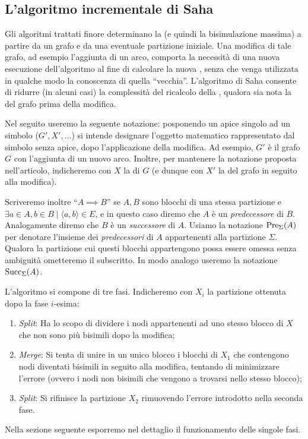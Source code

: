 \subsection{L'algoritmo incrementale di Saha}
Gli algoritmi trattati finore determinano la \rscpnomath (e quindi la bisimulazione massima) a partire da un grafo e da una eventuale partizione iniziale. Una modifica di tale grafo, ad esempio l'aggiunta di un arco, comporta la necessità di una nuova esecuzione dell'algoritmo al fine di calcolare la nuova \rscpnomath, senza che venga utilizzata in qualche modo la conoscenza di quella ``vecchia''. L'algoritmo di Saha \cite{saha} consente di ridurre (in alcuni casi) la complessità del ricalcolo della \rscpnomath, qualora sia nota la \rscpnomath del grafo prima della modifica.

Nel seguito useremo la seguente notazione: posponendo un apice singolo ad un simbolo ($G', X', \dots$) si intende designare l'oggetto matematico rappresentato dal simbolo senza apice, dopo l'applicazione della modifica. Ad esempio, $G'$ è il grafo $G$ con l'aggiunta di un nuovo arco. Inoltre, per mantenere la notazione proposta nell'articolo, indicheremo con $X$ la \rscpnomath di $G$ (e dunque con $X'$ la \rscpnomath del grafo in seguito alla modifica).

Scriveremo inoltre ``$A \implies B$'' se $A,B$ sono blocchi di una stessa partizione e $\exists a \in A, b \in B \mid \langle a, b\rangle \in E$, e in questo caso diremo che $A$ è un \emph{predecessore} di $B$. Analogamente diremo che $B$ è un \emph{successore} di $A$. Usiamo la notazione $\textup{Pre}_{\Sigma}(A)$ per denotare l'insieme dei \emph{predecessori} di $A$ appartenenti alla partizione $\Sigma$. Qualora la partizione cui questi blocchi appartengono possa essere omessa senza ambiguità ometteremo il subscritto. In modo analogo useremo la notazione $\textup{Succ}_{\Sigma}(A)$.

L'algoritmo si compone di tre fasi. Indicheremo con $X_i$ la partizione ottenuta dopo la fase $i$-esima:
\begin{enumerate}
    \item \emph{Split}: Ha lo scopo di dividere i nodi appartenenti ad uno stesso blocco di $X$ che non sono più bisimili dopo la modifica;
    \item \emph{Merge}: Si tenta di unire in un unico blocco i blocchi di $X_1$ che contengono nodi diventati bisimili in seguito alla modifica, tentando di minimizzare l'errore (ovvero i nodi non bisimili che vengono a trovarsi nello stesso blocco);
    \item \emph{Split}: Si rifinisce la partizione $X_2$ rimuovendo l'errore introdotto nella seconda fase.
\end{enumerate}
Nella sezione seguente esporremo nel dettaglio il funzionamento delle singole fasi.

